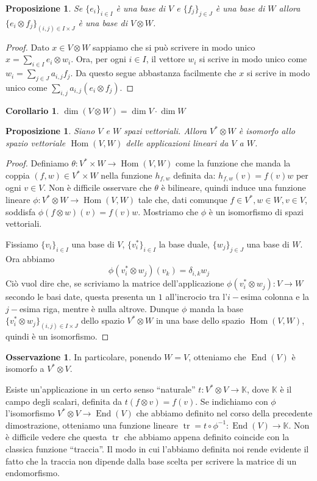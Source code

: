 \documentclass[11pt]{article}
\theoremstyle{plain}
\newtheorem{prop}[thm]{Proposizione}
\newtheorem*{cor}{Corollario}
\theoremstyle{definition}
\newtheorem*{rem}{Osservazione}
\theoremstyle{remark}
\newcommand{\K}{\mathbb{K}}
\DeclareMathOperator{\tr}{tr}
\DeclareMathOperator{\Hom}{Hom}
\DeclareMathOperator{\End}{End}
\begin{document}
\begin{prop}
Se $\{e_i\}_{i\in I}$ è una base di $V$ e $\{f_j\}_{j\in J}$ è una base di $W$ allora $\{e_i \otimes f_j\}_{(i,j)\in I\times J}$ è una base di $V \otimes W$.
\end{prop}
\begin{proof}
Dato $x\in V\otimes W$ sappiamo che si può scrivere in modo unico $x = \sum_{i\in I} e_i\otimes w_i$.
Ora, per ogni $i\in I$, il vettore $w_i$ si scrive in modo unico come $w_i = \sum_{j\in J} a_{i,j}f_j$.
Da questo segue abbastanza facilmente che $x$ si scrive in modo unico come $\sum_{i,j} a_{i,j}(e_i\otimes f_j)$.
\end{proof}

\begin{cor}
$\dim(V \otimes W) = \dim V \cdot \dim W$
\end{cor}


\begin{prop}
Siano $V$ e $W$ spazi vettoriali. Allora $V^*\otimes W$ è isomorfo allo spazio vettoriale $\Hom(V,W)$ delle applicazioni lineari da $V$ a $W$.
\end{prop}
\begin{proof}
Definiamo $\theta: V^*\times W \to \Hom(V,W)$ come la funzione che manda la coppia $(f, w)\in V^*\times W$ nella funzione  $h_{f,w}$ definita da:
$h_{f,w}(v) = f(v)w$ per ogni $v\in V$. Non è difficile osservare che $\theta$ è bilineare, quindi induce una funzione lineare
$\phi : V^*\otimes W \to \Hom(V,W)$ tale che, dati comunque $f\in V^*, w\in W, v\in V$, soddisfa $\phi(f\otimes w)(v) = f(v)w$.
Mostriamo che $\phi$ è un isomorfismo di spazi vettoriali.

Fissiamo $\{v_i\}_{i\in I}$ una base di $V$, $\{v_i^*\}_{i\in I}$ la base duale, $\{w_j\}_{j\in J}$ una base di $W$.
Ora abbiamo
\[\phi(v_i^*\otimes w_j)(v_k) = \delta_{i,k} w_j\]
Ciò vuol dire che, se scriviamo la matrice dell'applicazione $\phi(v_i^*\otimes w_j):V\to W$ secondo le basi date, questa presenta un $1$ all'incrocio
tra l'$i-$esima colonna e la $j-$esima riga, mentre è nulla altrove.
Dunque $\phi$ manda la base $\{v_i^*\otimes w_j\}_{(i,j)\in I\times J}$ dello spazio $V^*\otimes W$ in una base dello spazio $\Hom(V,W)$,
quindi è un isomorfismo.
\end{proof}

\begin{rem}
In particolare, ponendo $W=V$, otteniamo che $\End(V)$ è isomorfo a $V^*\otimes V$.

Esiste un'applicazione in un certo senso ``naturale'' $t:V^*\otimes V \to \K$, dove $\K$ è il campo degli scalari, definita da
$t(f\otimes v) = f(v)$.
Se indichiamo con $\phi$ l'isomorfismo $V^*\otimes V\to \End(V)$ che abbiamo definito nel corso della precedente dimostrazione,
otteniamo una funzione lineare $\tr = t\circ \phi^{-1}: \End(V)\to \K$. Non è difficile vedere che questa $\tr$ che abbiamo appena definito
coincide con la classica funzione ``traccia''. Il modo in cui l'abbiamo definita noi rende evidente il fatto che la traccia non dipende
dalla base scelta per scrivere la matrice di un endomorfismo.
\end{rem}
\end{document}
